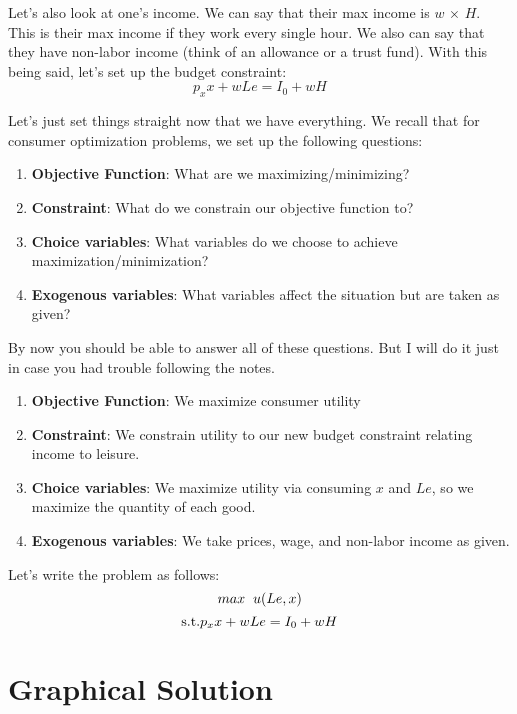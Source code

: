 \documentclass[11pt]{article}
\theoremstyle{definition}
\begin{document}
	Let's also look at one's income. We can say that their max income is $w$ $\times$ $H$. This is their max income if they work every single hour. We also can say that they have non-labor income (think of an allowance or a trust fund). With this being said, let's set up the budget constraint:
	\[p_x x + wLe = I_0 + wH\]
		
	Let's just set things straight now that we have everything. We recall that for consumer optimization problems, we set up the following questions:
	
	\begin{enumerate}
		\item \textbf{Objective Function}: What are we maximizing/minimizing?
		\item \textbf{Constraint}: What do we constrain our objective function to? 
		\item \textbf{Choice variables}: What variables do we choose to achieve maximization/minimization? 
		\item \textbf{Exogenous variables}: What variables affect the situation but are taken as given? 
	\end{enumerate}
	
	By now you should be able to answer all of these questions. But I will do it just in case you had trouble following the notes.  
	
	\begin{enumerate}
		\item \textbf{Objective Function}: We maximize consumer utility
		\item \textbf{Constraint}: We constrain utility to our new budget constraint relating income to leisure.
		\item \textbf{Choice variables}: We maximize utility via consuming $x$ and $Le$, so we maximize the quantity of each good. 
		\item \textbf{Exogenous variables}: We take prices, wage, and  non-labor income as given. 
	\end{enumerate}
	
	Let's write the problem as follows:
	\[max \hspace{.2cm} u(Le, x) \]
	\[ \textnormal{s.t.}  p_x x + wLe = I_0 + wH \]
	
\section{Graphical Solution} 

%

	
\end{document}

